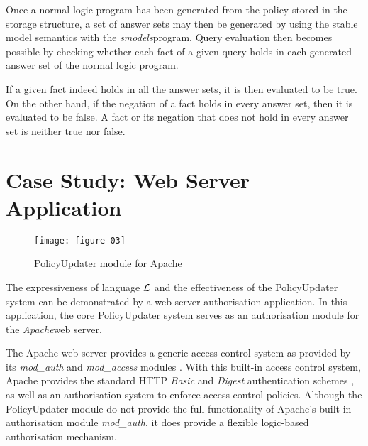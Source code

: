 \documentclass[global,twocolumn,final]{svjour}
\begin{document}
        Once a normal logic program has been generated from the policy stored
        in the storage structure, a set of answer sets may then be generated
        by using the stable model semantics \cite{SIM} with the
        {\em smodels}\footnotemark program. Query evaluation then becomes
        possible by checking whether each fact of a given query holds in each
        generated answer set of the normal logic program.


        If a given fact indeed holds in all the answer sets, it is then
        evaluated to be true. On the other hand, if the negation of a fact
        holds in every answer set, then it is evaluated to be false. A fact
        or its negation that does not hold in every answer set is neither true
        nor false.

  \section{Case Study: Web Server Application}
    \label{sec-case}

    \begin{figure}[ht]
      \begin{center}
        \texttt{[image: figure-03]}
        \caption{PolicyUpdater module for Apache}
        \label{fig-3}
      \end{center}
    \end{figure}

    The expressiveness of language $\cal{L}$ and the effectiveness of the
    PolicyUpdater system can be demonstrated by a web server authorisation
    application. In this application, the core PolicyUpdater system serves as
    an authorisation module for the {\em Apache}\footnotemark web server.


    The Apache web server provides a generic access control system as provided
    by its {\em mod\_auth} and {\em mod\_access} modules \cite{AP,LAU}. With
    this built-in access control system, Apache provides the standard HTTP
    {\em Basic} and {\em Digest} authentication schemes \cite{HTTP2}, as well
    as an authorisation system to enforce access control policies. Although the
    PolicyUpdater module do not provide the full functionality of Apache's
    built-in authorisation module {\em mod\_auth}, it does provide a flexible
    logic-based authorisation mechanism.
\end{document}
